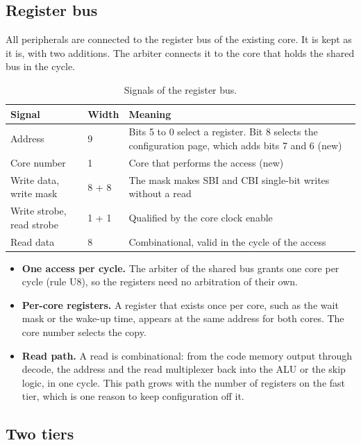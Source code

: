 \documentclass[10pt,a4paper]{article}
\begin{document}
\subsection{Register bus}

All peripherals are connected to the register bus of the existing core. It is kept as it is, with two additions. The arbiter connects it to the core that holds the shared bus in the cycle.

\begin{table}[H]
\centering\small
\begin{tabularx}{\linewidth}{@{}llL@{}}
\toprule
Signal & Width & Meaning \\
\midrule
Address & 9 & Bits 5 to 0 select a register. Bit 8 selects the configuration page, which adds bits 7 and 6 (new) \\
Core number & 1 & Core that performs the access (new) \\
Write data, write mask & 8 + 8 & The mask makes SBI and CBI single-bit writes without a read \\
Write strobe, read strobe & 1 + 1 & Qualified by the core clock enable \\
Read data & 8 & Combinational, valid in the cycle of the access \\
\bottomrule
\end{tabularx}
\caption{Signals of the register bus.}
\end{table}

\begin{itemize}
\item \textbf{One access per cycle.} The arbiter of the shared bus grants one core per cycle (rule U8), so the registers need no arbitration of their own.
\item \textbf{Per-core registers.} A register that exists once per core, such as the wait mask or the wake-up time, appears at the same address for both cores. The core number selects the copy.
\item \textbf{Read path.} A read is combinational: from the code memory output through decode, the address
and the read multiplexer back into the ALU or the skip logic, in one cycle. This path grows with the number of
registers on the fast tier, which is one reason to keep configuration off it.
\end{itemize}

\subsection{Two tiers}
\end{document}
